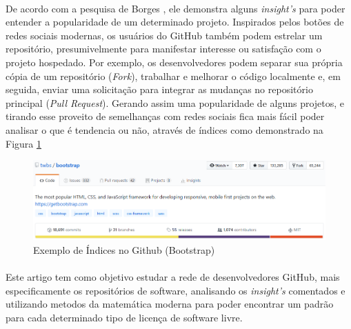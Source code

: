 \paragraph{}
De acordo com a pesquisa de Borges \cite{borges2016understanding}, ele demonstra alguns \textit{insight's} para poder entender a popularidade de um determinado projeto. Inspirados pelos botões de redes sociais modernas, os usuários do GitHub também podem estrelar um repositório, presumivelmente para manifestar interesse ou satisfação com o projeto hospedado\cite{gousios2014exploratory, gousios2015work}.
Por exemplo, os desenvolvedores podem separar sua própria cópia de um repositório (\textit{Fork}), trabalhar e melhorar o código localmente e, em seguida, enviar uma solicitação para integrar as mudanças no repositório principal (\textit{Pull Request})\cite{borges2016understanding}. Gerando assim uma popularidade de alguns projetos, e tirando esse proveito de semelhanças com redes sociais fica mais fácil poder analisar o que é tendencia ou não, através de índices como demonstrado na Figura \ref{fig:github-linux}
\begin{figure}[ht!]
    \centering
    \includegraphics[width=\linewidth]{assets/images/github-linux.PNG}
    \caption{Exemplo de Índices no Github (Bootstrap)}
    \label{fig:github-linux}
\end{figure}

\paragraph{}
Este artigo tem como objetivo estudar a rede de desenvolvedores GitHub, mais especificamente os repositórios de software, analisando os \textit{insight's} comentados e utilizando metodos da matemática moderna para poder encontrar um padrão para cada determinado tipo de licença de software livre.
